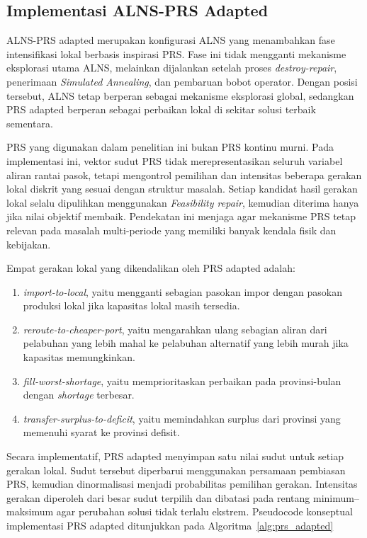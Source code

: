 \documentclass{file/TA-ITS}
\theoremstyle{definition}
\theoremstyle{definition}
\theoremstyle{plain}
\begin{document}
\subsection{Implementasi ALNS-PRS Adapted}

ALNS-PRS adapted merupakan konfigurasi ALNS yang menambahkan fase intensifikasi lokal berbasis inspirasi PRS. Fase ini tidak mengganti mekanisme eksplorasi utama ALNS, melainkan dijalankan setelah proses \textit{destroy-repair}, penerimaan \textit{Simulated Annealing}, dan pembaruan bobot operator. Dengan posisi tersebut, ALNS tetap berperan sebagai mekanisme eksplorasi global, sedangkan PRS adapted berperan sebagai perbaikan lokal di sekitar solusi terbaik sementara.

PRS yang digunakan dalam penelitian ini bukan PRS kontinu murni. Pada implementasi ini, vektor sudut PRS tidak merepresentasikan seluruh variabel aliran rantai pasok, tetapi mengontrol pemilihan dan intensitas beberapa gerakan lokal diskrit yang sesuai dengan struktur masalah. Setiap kandidat hasil gerakan lokal selalu dipulihkan menggunakan \textit{Feasibility repair}, kemudian diterima hanya jika nilai objektif membaik. Pendekatan ini menjaga agar mekanisme PRS tetap relevan pada masalah multi-periode yang memiliki banyak kendala fisik dan kebijakan.

Empat gerakan lokal yang dikendalikan oleh PRS adapted adalah:
\begin{enumerate}
    \item \textit{import-to-local}, yaitu mengganti sebagian pasokan impor dengan pasokan produksi lokal jika kapasitas lokal masih tersedia.
    \item \textit{reroute-to-cheaper-port}, yaitu mengarahkan ulang sebagian aliran dari pelabuhan yang lebih mahal ke pelabuhan alternatif yang lebih murah jika kapasitas memungkinkan.
    \item \textit{fill-worst-shortage}, yaitu memprioritaskan perbaikan pada provinsi-bulan dengan \textit{shortage} terbesar.
    \item \textit{transfer-surplus-to-deficit}, yaitu memindahkan surplus dari provinsi yang memenuhi syarat ke provinsi defisit.
\end{enumerate}
Secara implementatif, PRS adapted menyimpan satu nilai sudut untuk setiap gerakan lokal. Sudut tersebut diperbarui menggunakan persamaan pembiasan PRS, kemudian dinormalisasi menjadi probabilitas pemilihan gerakan. Intensitas gerakan diperoleh dari besar sudut terpilih dan dibatasi pada rentang minimum--maksimum agar perubahan solusi tidak terlalu ekstrem. Pseudocode konseptual implementasi PRS adapted ditunjukkan pada Algoritma~\ref{alg:prs_adapted}
\end{document}
